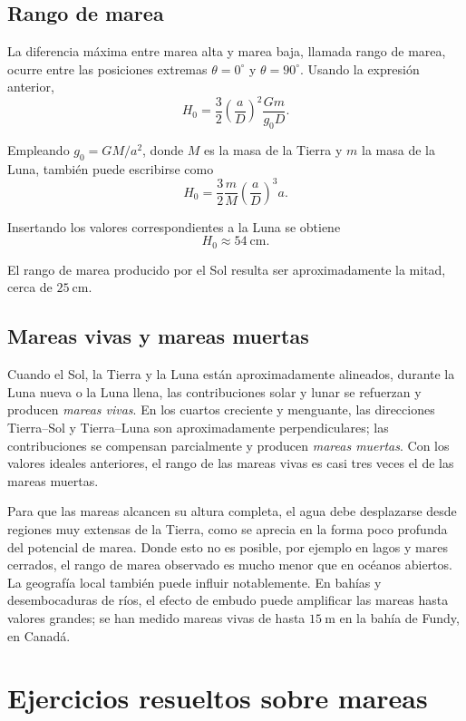 \figuraProtuberanciasMarea

\subsection{Rango de marea}

La diferencia máxima entre marea alta y marea baja, llamada rango de marea, ocurre entre las posiciones extremas $\theta = 0^\circ$ y $\theta = 90^\circ$. Usando la expresión anterior,
$$ H_0 = \frac{3}{2}\left(\frac{a}{D}\right)^2\frac{Gm}{g_0D}. $$

Empleando $g_0 = GM/a^2$, donde $M$ es la masa de la Tierra y $m$ la masa de la Luna, también puede escribirse como
$$ H_0 = \frac{3}{2}\frac{m}{M}\left(\frac{a}{D}\right)^3 a. $$

Insertando los valores correspondientes a la Luna se obtiene
$$ H_0 \approx 54\ \mathrm{cm}. $$

El rango de marea producido por el Sol resulta ser aproximadamente la mitad, cerca de $25\ \mathrm{cm}$.

\subsection{Mareas vivas y mareas muertas}

Cuando el Sol, la Tierra y la Luna están aproximadamente alineados, durante la Luna nueva o la Luna llena, las contribuciones solar y lunar se refuerzan y producen \emph{mareas vivas}. En los cuartos creciente y menguante, las direcciones Tierra--Sol y Tierra--Luna son aproximadamente perpendiculares; las contribuciones se compensan parcialmente y producen \emph{mareas muertas}. Con los valores ideales anteriores, el rango de las mareas vivas es casi tres veces el de las mareas muertas.

\figuraMareasVivasMuertas

Para que las mareas alcancen su altura completa, el agua debe desplazarse desde regiones muy extensas de la Tierra, como se aprecia en la forma poco profunda del potencial de marea. Donde esto no es posible, por ejemplo en lagos y mares cerrados, el rango de marea observado es mucho menor que en océanos abiertos. La geografía local también puede influir notablemente. En bahías y desembocaduras de ríos, el efecto de embudo puede amplificar las mareas hasta valores grandes; se han medido mareas vivas de hasta $15\ \mathrm{m}$ en la bahía de Fundy, en Canadá.

\section{Ejercicios resueltos sobre mareas}


